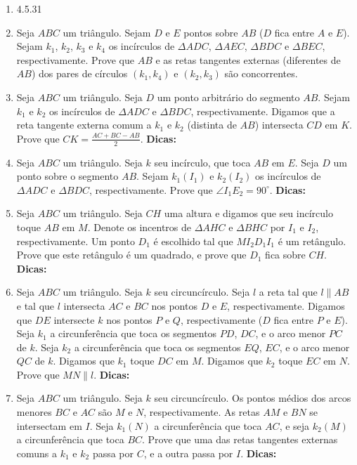 \documentclass{article}
\newcommand{\dica}{\textbf{Dicas:}}
\newcommand{\iniTri}{Seja $ABC$ um triângulo}
\begin{document}
\begin{multicols}{2}
\begin{enumerate}
    \item 4.5.31
    
    \item \iniTri. Sejam $D$ e $E$ pontos sobre $AB$ ($D$ fica entre $A$ e $E$). Sejam $k_1$, $k_2$, $k_3$ e $k_4$ os incírculos de $\Delta ADC$, $\Delta AEC$, $\Delta BDC$ e $\Delta BEC$, respectivamente. Prove que $AB$ e as retas tangentes externas (diferentes de $AB$) dos pares de círculos $(k_1,k_4)$ e $(k_2,k_3)$ são concorrentes.
    
    \item \iniTri. Seja $D$ um ponto arbitrário do segmento $AB$. Sejam $k_1$ e $k_2$ os incírculos de $\Delta ADC$ e $\Delta BDC$, respectivamente. Digamos que a reta tangente externa comum a $k_1$ e $k_2$ (distinta de $AB$) intersecta $CD$ em $K$. Prove que $CK=\frac{AC+BC-AB}{2}$. \dica %
    
    \item \iniTri. Seja $k$ seu incírculo, que toca $AB$ em $E$. Seja $D$ um ponto sobre o segmento $AB$. Sejam $k_1(I_1)$ e $k_2(I_2)$ os incírculos de $\Delta ADC$ e $\Delta BDC$, respectivamente. Prove que $\angle I_1E_2=90^{\circ}$. \dica %
    
    \item \iniTri. Seja $CH$ uma altura e digamos que seu incírculo toque $AB$ em $M$. Denote os incentros de $\Delta AHC$ e $\Delta BHC$ por $I_1$ e $I_2$, respectivamente. Um ponto $D_1$ é escolhido tal que $MI_2D_1I_1$ é um retângulo. Prove que este retângulo é um quadrado, e prove que $D_1$ fica sobre $CH$. \dica %
    
    \item \iniTri. Seja $k$ seu circuncírculo. Seja $l$ a reta tal que $l\parallel AB$ e tal que $l$ intersecta $AC$ e $BC$ nos pontos $D$ e $E$, respectivamente. Digamos que $DE$ intersecte $k$ nos pontos $P$ e $Q$, respectivamente ($D$ fica entre $P$ e $E$). Seja $k_1$ a circunferência que toca os segmentos $PD$, $DC$, e o arco menor $PC$ de $k$. Seja $k_2$ a circunferência que toca os segmentos $EQ$, $EC$, e o arco menor $QC$ de $k$. Digamos que $k_1$ toque $DC$ em $M$. Digamos que $k_2$ toque $EC$ em $N$. Prove que $MN\parallel l$. \dica %
    
    \item \iniTri. Seja $k$ seu circuncírculo. Os pontos médios dos arcos menores $BC$ e $AC$ são $M$ e $N$, respectivamente. As retas $AM$ e $BN$ se intersectam em $I$. Seja $k_1(N)$ a circunferência que toca $AC$, e seja $k_2(M)$ a circunferência que toca $BC$. Prove que uma das retas tangentes externas comuns a $k_1$ e $k_2$ passa por $C$, e a outra passa por $I$. \dica %
    

\end{enumerate}
\end{multicols}
\end{document}
